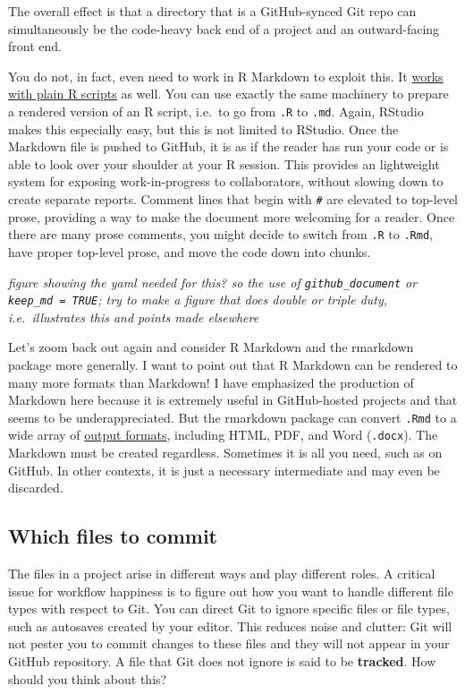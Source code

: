 \documentclass[12pt]{article}
\begin{document}
The overall effect is that a directory that is a GitHub-synced Git repo
can simultaneously be the code-heavy back end of a project and an
outward-facing front end.

You do not, in fact, even need to work in R Markdown to exploit this. It
\href{http://rmarkdown.rstudio.com/articles_report_from_r_script.html}{works
with plain R scripts} as well. You can use exactly the same machinery to
prepare a rendered version of an R script, i.e.~to go from \texttt{.R}
to \texttt{.md}. Again, RStudio makes this especially easy, but this is
not limited to RStudio. Once the Markdown file is pushed to GitHub, it
is as if the reader has run your code or is able to look over your
shoulder at your R session. This provides an lightweight system for
exposing work-in-progress to collaborators, without slowing down to
create separate reports. Comment lines that begin with
\texttt{\#\textquotesingle{}} are elevated to top-level prose, providing
a way to make the document more welcoming for a reader. Once there are
many prose comments, you might decide to switch from \texttt{.R} to
\texttt{.Rmd}, have proper top-level prose, and move the code down into
chunks.

\emph{figure showing the yaml needed for this? so the use of
\texttt{github\_document} or \texttt{keep\_md\ =\ TRUE}; try to make a
figure that does double or triple duty, i.e.~illustrates this and points
made elsewhere}

Let's zoom back out again and consider R Markdown and the rmarkdown
package more generally. I want to point out that R Markdown can be
rendered to many more formats than Markdown! I have emphasized the
production of Markdown here because it is extremely useful in
GitHub-hosted projects and that seems to be underappreciated. But the
rmarkdown package can convert \texttt{.Rmd} to a wide array of
\href{http://rmarkdown.rstudio.com/lesson-9.html}{output formats},
including HTML, PDF, and Word (\texttt{.docx}). The Markdown must be
created regardless. Sometimes it is all you need, such as on GitHub. In
other contexts, it is just a necessary intermediate and may even be
discarded.

\subsection{Which files to commit}\label{which-files-to-commit}

The files in a project arise in different ways and play different roles.
A critical issue for workflow happiness is to figure out how you want to
handle different file types with respect to Git. You can direct Git to
ignore specific files or file types, such as autosaves created by your
editor. This reduces noise and clutter: Git will not pester you to
commit changes to these files and they will not appear in your GitHub
repository. A file that Git does not ignore is said to be
\textbf{tracked}. How should you think about this?
\end{document}
